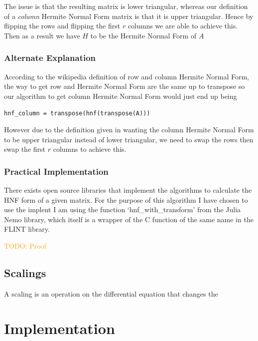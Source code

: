 \documentclass[oneside, a4paper, onecolumn, 11pt]{article}
\newcommand{\todo}[1]{
    \begin{mdframed}
        \textcolor{orange}{
        TODO: #1
        }
    \end{mdframed}
}
\begin{document}
The issue is that the resulting matrix is lower triangular, whereas our definition of a \textit{column} Hermite Normal Form matrix is that it is upper triangular. Hence by flipping the rows and flipping the first \(r\) columns we are able to achieve this. Then as a result we have \(H\) to be the Hermite Normal Form of \(A\)


\subsubsection{Alternate Explanation}

According to the wikipedia definition of row and column Hermite Normal Form, the way to get row and Hermite Normal Form are the same up to transpose so our algorithm to get column Hermite Normal Form would just end up being

\texttt{hnf\_column = transpose(hnf(transpose(A)))}

However due to the definition given in \cite{Hubert2013} wanting the column Hermite Normal Form to be upper triangular instead of lower triangular, we need to swap the rows then swap the first \(r\) columns to achieve this.

\subsubsection{Practical Implementation}

There exists open source libraries that implement the algorithms to calculate the HNF form of a given matrix. For the purpose of this algorithm I have chosen to use the implent I am using the function `hnf\_with\_transform' from the Julia Nemo library, which itself is a wrapper of the C function of the same name in the FLINT library.

\todo{Proof}


\subsection{Scalings}

A scaling is an operation on the differential equation that changes the

\section{Implementation}

\end{document}
